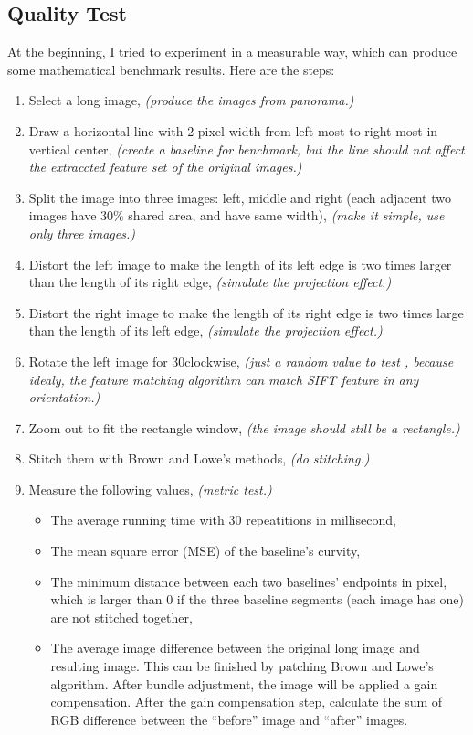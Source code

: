 \documentclass[10pt,twocolumn,letterpaper]{article}
\begin{document}
\subsection{Quality Test}
At the beginning, I tried to experiment in a measurable way, which can produce some mathematical benchmark results. Here are the steps:
\begin{enumerate}
    \item Select a long image, \textit{(produce the images from panorama.)}
    \item Draw a horizontal line with 2 pixel width from left most to right most in vertical center, \textit{(create a baseline for benchmark, but the line should not affect the extraccted feature set of the original images.)}
    \item \label{bm:sp} Split the image into three images: left, middle and right (each adjacent two images have 30\% shared area, and have same width), \textit{(make it simple, use only three images.)}
    \item Distort the left image to make the length of its left edge is two times larger than the length of its right edge, \textit{(simulate the projection effect.)}
    \item Distort the right image to make the length of its right edge is two times large than the length of its left edge, \textit{(simulate the projection effect.)}
    \item Rotate the left image for 30\degree clockwise, \textit{(just a random value to test , because idealy, the feature matching algorithm can match SIFT feature in any orientation.)}
    \item \label{bm:zoom} Zoom out to fit the rectangle window, \textit{(the image should still be a rectangle.)}
    \item Stitch them with Brown and Lowe's methods, \textit{(do stitching.)}
    \item Measure the following values, \textit{(metric test.)} 
    \begin{itemize}
        \item The average running time with 30 repeatitions in millisecond,
        \item The mean square error (MSE) of the baseline's curvity,
        \item The minimum distance between each two baselines' endpoints in pixel,
              which is larger than 0 if the three baseline segments (each image has one) are not stitched together,
        \item The average image difference between the original long image and resulting image.
              This can be finished by patching Brown and Lowe's algorithm. After bundle adjustment, the image will be applied a gain compensation.
              After the gain compensation step, calculate the sum of RGB difference between the ``before'' image and ``after'' images.
    \end{itemize}
\end{enumerate}
\end{document}
